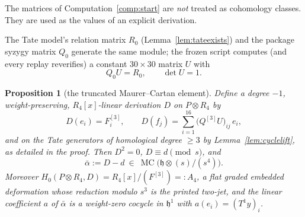 \documentclass[11pt]{article}
\newtheorem{proposition}[theorem]{Proposition}
\theoremstyle{definition}
\theoremstyle{remark}
\newcommand{\MC}{\operatorname{MC}}
\newcommand{\h}{\mathfrak h}
\begin{document}
The matrices of Computation~\ref{comp:start} are \emph{not} treated as
cohomology classes.  They are used as the values of an explicit derivation.

The Tate model's relation matrix $R_0$ (Lemma~\ref{lem:tateexists}) and the
package syzygy matrix $Q_0$ generate the same module; the frozen script
 computes (and every
replay reverifies) a constant $30\times30$ matrix $U$ with
\[
 Q_0U=R_0,\qquad \det U=1 .
\tag{4.3}\label{eq:U}
\]

\begin{proposition}[the truncated Maurer--Cartan element]\label{prop:start}
Define a degree $-1$, weight-preserving, $R_4[x]$-linear derivation $D$ on
$P\otimes R_4$ by
\[
 D(e_i)=F^{[3]}_i,
 \qquad
 D(f_j)=\sum_{i=1}^{16}\bigl(Q^{[3]}U\bigr)_{ij}\,e_i,
\tag{4.4}\label{eq:Ddef}
\]
and on the Tate generators of homological degree $\geq3$ by
Lemma~\textup{\ref{lem:cyclelift}}, as detailed in the proof.  Then $D^2=0$,
$D\equiv d\pmod s$, and
\[
 \bar\alpha:=D-d\ \in\ \MC\bigl(\h\otimes(s)/(s^4)\bigr).
\tag{4.5}\label{eq:alphabar}
\]
Moreover $H_0(P\otimes R_4,D)=R_4[x]/(F^{[3]})=:A_4$, a flat graded embedded
deformation whose reduction modulo $s^3$ is the printed two-jet, and the
linear coefficient $a$ of $\bar\alpha$ is a weight-zero cocycle in $\h^1$
with $a(e_i)=(T^1y)_i$.
\end{proposition}
\end{document}
